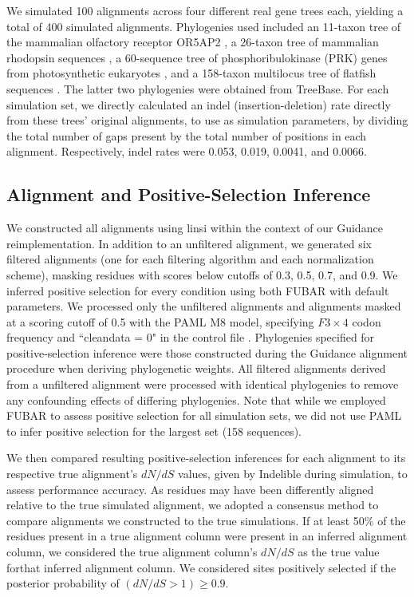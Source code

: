 \documentclass[10pt]{article}
\begin{document}
We simulated 100 alignments across four different real gene trees each, yielding a total of 400 simulated alignments. Phylogenies used included an 11-taxon tree of the mammalian olfactory receptor OR5AP2 \citep{Spielman2013}, a 26-taxon tree of mammalian rhodopsin sequences \citep{Spielman2013}, a 60-sequence tree of phosphoribulokinase (PRK) genes from photosynthetic eukaryotes \citep{Yang2011}, and a 158-taxon multilocus tree of flatfish sequences \citep{Betancur2013}. The latter two phylogenies were obtained from TreeBase.
For each simulation set, we directly calculated an indel (insertion-deletion) rate directly from these trees’ original alignments, to use as simulation parameters, by dividing the total number of gaps present by the total number of positions in each alignment. Respectively, indel rates were 0.053, 0.019, 0.0041, and 0.0066. 

\subsection*{Alignment and Positive-Selection Inference}
We constructed all alignments using linsi \citep{Katoh2002,Katoh2005} within the context of our Guidance reimplementation. In addition to an unfiltered alignment, we generated six filtered alignments (one for each filtering algorithm and each normalization scheme), masking residues with scores below cutoffs of 0.3, 0.5, 0.7, and 0.9. We inferred positive selection for every condition using both FUBAR \citep{Murrell2013} with default parameters. We processed only the unfiltered alignments and alignments masked at a scoring cutoff of 0.5 with the PAML M8 model, specifying $F3\times4$ codon frequency and ``cleandata = 0" in the control file \citep{Yang2007}. Phylogenies specified for positive-selection inference were those constructed during the Guidance alignment procedure when deriving phylogenetic weights. All filtered alignments derived from a unfiltered alignment were processed with identical phylogenies to remove any confounding effects of differing phylogenies. Note that while we employed FUBAR to assess positive selection for all simulation sets, we did not use PAML to infer positive selection for the largest set (158 sequences).

We then compared resulting positive-selection inferences for each alignment to its respective true alignment's $dN/dS$ values, given by Indelible during simulation, to assess performance accuracy. As residues may have been differently aligned relative to the true simulated alignment, we adopted a consensus method to compare alignments we constructed to the true simulations. If at least 50\% of the residues present in a true alignment column were present in an inferred alignment column, we considered the true alignment column's $dN/dS$ as the true value forthat inferred alignment column. We considered sites positively selected if the posterior probability of $(dN/dS>1) \geq 0.9$.
\end{document}
